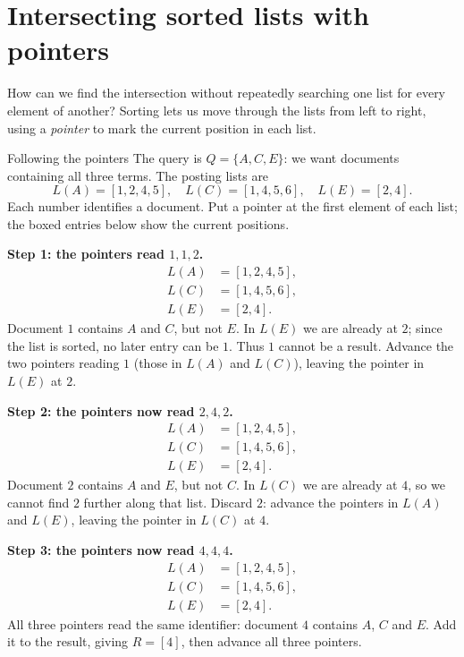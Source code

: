 \documentclass[a4paper,12pt,oneside]{report}
\begin{document}
\section{Intersecting sorted lists with pointers}

How can we find the intersection without repeatedly searching one
list for every element of another? Sorting lets us move through the
lists from left to right, using a \emph{pointer} to mark the current
position in each list.

\begin{framedexample}{Following the pointers}\label{ex:posting-pointers}
The query is $Q=\{A,C,E\}$: we want documents containing all three
terms. The posting lists are
\[
  L(A)=[1,2,4,5],\quad L(C)=[1,4,5,6],\quad L(E)=[2,4].
\]
Each number identifies a document. Put a pointer at the first element
of each list; the boxed entries below show the current positions.

\textbf{Step 1: the pointers read $1,1,2$.}
\[
\begin{aligned}
  L(A)&=[\boxed{1},2,4,5],\\
  L(C)&=[\boxed{1},4,5,6],\\
  L(E)&=[\boxed{2},4].
\end{aligned}
\]
Document $1$ contains $A$ and $C$, but not $E$. In $L(E)$ we are
already at $2$; since the list is sorted, no later entry can be $1$.
Thus $1$ cannot be a result. Advance the two pointers reading $1$
(those in $L(A)$ and $L(C)$), leaving the pointer in $L(E)$ at $2$.

\textbf{Step 2: the pointers now read $2,4,2$.}
\[
\begin{aligned}
  L(A)&=[1,\boxed{2},4,5],\\
  L(C)&=[1,\boxed{4},5,6],\\
  L(E)&=[\boxed{2},4].
\end{aligned}
\]
Document $2$ contains $A$ and $E$, but not $C$. In $L(C)$ we are
already at $4$, so we cannot find $2$ further along that list.
Discard $2$: advance the pointers in $L(A)$ and $L(E)$, leaving the
pointer in $L(C)$ at $4$.

\textbf{Step 3: the pointers now read $4,4,4$.}
\[
\begin{aligned}
  L(A)&=[1,2,\boxed{4},5],\\
  L(C)&=[1,\boxed{4},5,6],\\
  L(E)&=[2,\boxed{4}].
\end{aligned}
\]
All three pointers read the same identifier: document $4$ contains
$A$, $C$ and $E$. Add it to the result, giving $R=[4]$, then advance
all three pointers.


\end{framedexample}
\end{document}
